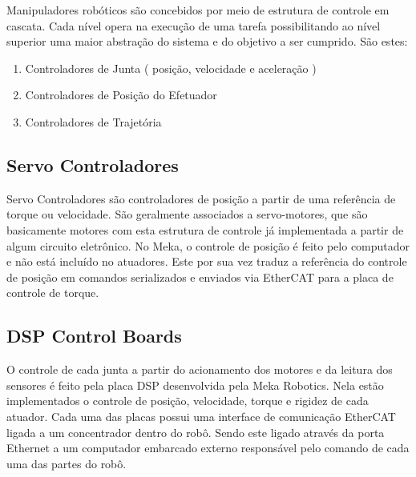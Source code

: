 Manipuladores robóticos são concebidos por meio de estrutura de controle em cascata. Cada nível opera na execução de uma tarefa possibilitando ao nível superior uma maior abstração do sistema e do objetivo a ser cumprido. São estes:

\begin{enumerate}
    \item Controladores de Junta ( posição, velocidade e aceleração )
    \item Controladores de Posição do Efetuador
    \item Controladores de Trajetória
\end{enumerate}

\subsection{Servo Controladores}

Servo Controladores são controladores de posição a partir de uma referência de torque ou velocidade. São geralmente associados a servo-motores, que são basicamente motores com esta estrutura de controle já implementada a partir de algum circuito eletrônico. No Meka, o controle de posição é feito pelo computador e não está incluído no atuadores. Este por sua vez traduz a referência do controle de posição em comandos serializados e enviados via EtherCAT para a placa de controle de torque.

\subsection{DSP Control Boards}
O controle de cada junta a partir do acionamento dos motores e da leitura dos sensores é feito pela placa DSP desenvolvida pela Meka Robotics. Nela estão implementados o controle de posição, velocidade, torque e rigidez de cada atuador. Cada uma das placas possui uma interface de comunicação EtherCAT ligada a um concentrador dentro do robô. Sendo este ligado através da porta Ethernet a um computador embarcado externo responsável pelo comando de cada uma das partes do robô.


